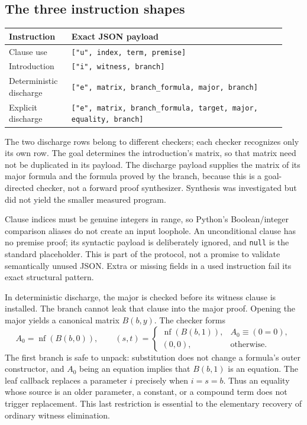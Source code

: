 \documentclass[11pt,letterpaper]{article}
\theoremstyle{definition}\newtheorem{definition}[theorem]{Definition}
\theoremstyle{remark}\newtheorem{remark}[theorem]{Remark}
\newcommand{\nf}{\operatorname{nf}}
\begin{document}
\subsection{The three instruction shapes}

\begin{center}
\small
\begin{tabular}{@{}>{\raggedright\arraybackslash}p{0.21\linewidth}p{0.72\linewidth}@{}}
\toprule
Instruction & Exact JSON payload\\
\midrule
Clause use & \texttt{["u", index, term, premise]}\\[3pt]
Introduction & \texttt{["i", witness, branch]}\\[3pt]
Deterministic discharge &
\texttt{["e", matrix, branch\_formula, major, branch]}\\[3pt]
Explicit discharge &
\texttt{["e", matrix, branch\_formula, target, major, equality, branch]}\\
\bottomrule
\end{tabular}
\end{center}

The two discharge rows belong to different checkers; each checker recognizes
only its own row. The goal determines the introduction's matrix, so that
matrix need not be duplicated in its payload. The discharge payload supplies
the matrix of its major formula and the formula proved by the branch,
because this is a goal-directed checker, not a forward proof synthesizer.
Synthesis was investigated but did not yield the smaller measured program.

Clause indices must be genuine integers in range, so Python's Boolean/integer
comparison aliases do not create an input loophole. An unconditional clause
has no premise proof; its syntactic payload is deliberately ignored, and
\texttt{null} is the standard placeholder. This is part of the protocol,
not a promise to validate semantically unused JSON. Extra or missing fields
in a used instruction fail its exact structural pattern.

In deterministic discharge, the major is checked before its witness clause
is installed. The branch cannot leak that clause into the major proof.
Opening the major yields a canonical matrix $B(b,y)$. The checker forms
\[
  A_0=\nf(B(b,0)),\qquad
  (s,t)=
  \begin{cases}
   \nf(B(b,1)),&A_0\equiv(0=0),\\
   (0,0),&\text{otherwise}.
  \end{cases}
\]
The first branch is safe to unpack: substitution does not change a formula's
outer constructor, and $A_0$ being an equation implies that $B(b,1)$ is an
equation. The leaf callback replaces a parameter $i$ precisely when
$i=s=b$. Thus an equality whose source is an older parameter, a constant,
or a compound term does not trigger replacement. This last restriction is
essential to the elementary recovery of ordinary witness elimination.
\end{document}
